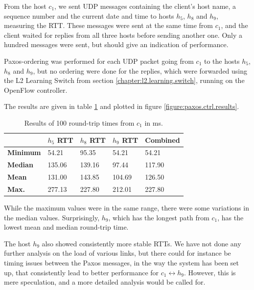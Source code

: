 From the host $c_1$, we sent UDP messages containing the client's host name,
a sequence number and the current date and time to hosts $h_5$, $h_8$
and $h_9$, measuring the \acf{RTT}.  These messages were sent at the same
time from $c_1$, and the client waited for replies from all three hosts
before sending another one.  Only a hundred messages were sent, but should
give an indication of performance.

Paxos-ordering was performed for each UDP packet going from $c_1$ to the
hosts $h_5$, $h_8$ and $h_9$, but no ordering were done for the replies,
which were forwarded using the L2 Learning Switch from section
\vref{chapter:l2.learning.switch}, running on the
OpenFlow controller.

The results are given in table \ref{table:paxos.ctrl.results} and plotted in
figure \ref{figure:paxos.ctrl.results}.

\begin{table}
  \centering
  \begin{tabular}{|l|l|l|l|l|}
    \hline
      \textbf{} &
      \textbf{$h_5$ RTT} &
      \textbf{$h_8$ RTT} &
      \textbf{$h_9$ RTT} &
      \textbf{Combined}
      \\

    \hline \textbf{Minimum} & 54.21 & 95.35 & 54.21 & 54.21 \\
    \hline \textbf{Median} & 135.06 & 139.16 & 97.44 & 117.90\\
    \hline \textbf{Mean} & 131.00 & 143.85 & 104.69 & 126.50 \\
    \hline \textbf{Max.} & 277.13 & 227.80 & 212.01 & 227.80 \\
    \hline
  \end{tabular}
  \caption{Results of 100 round-trip times from $c_1$ in ms.}
  \label{table:paxos.ctrl.results}
\end{table}

While the maximum values were in the same range, there were some variations in
the median values.  Surprisingly, $h_9$, which has the longest path from $c_1$,
has the lowest mean and median round-trip time.

The host $h_9$ also showed consistently more stable RTTs.
We have not done any further analysis on the load of various links, but
there could for instance be timing issues between the Paxos messages, in the
way the system has been set up, that consistently lead to better performance
for $c_1 \leftrightarrow h_9$.  However, this is mere speculation, and a
more detailed analysis would be called for.

